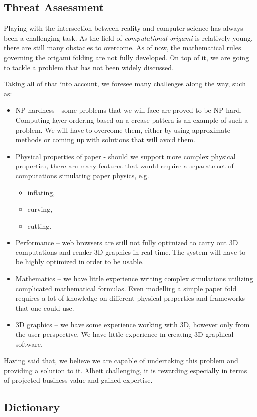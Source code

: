 \subsection{Threat Assessment}

Playing with the intersection between reality and computer science has always been a challenging task.
As the field of \textit{computational origami} is relatively young\cite{recent-results-in-computational-origami:paper}, there are still many obstacles to overcome.
As of now, the mathematical rules governing the origami folding are not fully developed.
On top of it, we are going to tackle a problem that has not been widely discussed.

Taking all of that into account, we foresee many challenges along the way, such as:

\begin{itemize}
	\item NP-hardness - some problems that we will face are proved to be NP-hard.
		Computing layer ordering based on a crease pattern is an example of such a problem.
		We will have to overcome them, either by using approximate methods or coming up with solutions that will avoid them.

	\item Physical properties of paper - should we support more complex physical properties,
		there are many features that would require a separate set of computations simulating paper physics, e.g.
		\begin{itemize}
			\item inflating,
			\item curving,
			\item cutting.
		\end{itemize}

	\item Performance -- web browsers are still not fully optimized to carry out 3D computations and render 3D graphics in real time.
		The system will have to be highly optimized in order to be usable.
		
	\item Mathematics -- we have little experience writing complex simulations utilizing complicated mathematical formulas.
		Even modelling a simple paper fold requires a lot of knowledge on different physical properties and frameworks that one could use.

	\item 3D graphics -- we have some experience working with 3D, however only from the user perspective.
		We have little experience in creating 3D graphical software.

\end{itemize}

Having said that, we believe we are capable of undertaking this problem and providing a solution to it.
Albeit challenging, it is rewarding especially in terms of projected business value and gained expertise.

\subsection{Dictionary}\label{dictionary}



